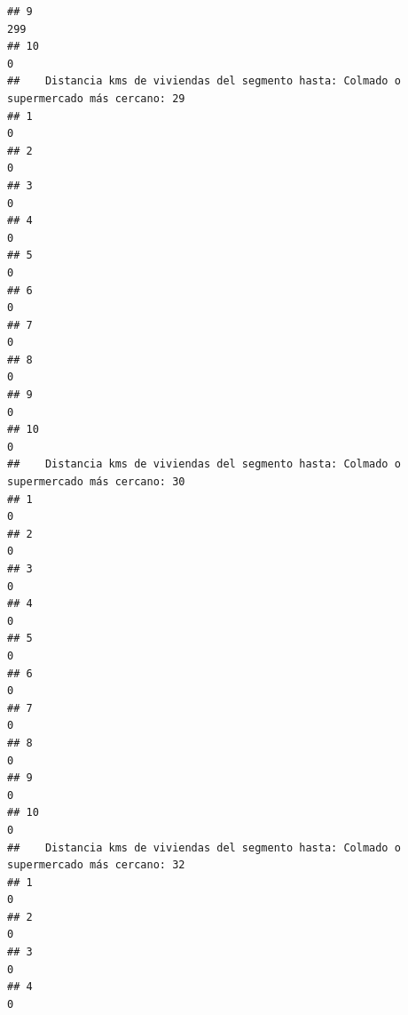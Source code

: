 \documentclass[11pt,]{article}
\begin{document}
\begin{verbatim}
## 9                                                                                    299
## 10                                                                                     0
##    Distancia kms de viviendas del segmento hasta: Colmado o supermercado más cercano: 29
## 1                                                                                      0
## 2                                                                                      0
## 3                                                                                      0
## 4                                                                                      0
## 5                                                                                      0
## 6                                                                                      0
## 7                                                                                      0
## 8                                                                                      0
## 9                                                                                      0
## 10                                                                                     0
##    Distancia kms de viviendas del segmento hasta: Colmado o supermercado más cercano: 30
## 1                                                                                      0
## 2                                                                                      0
## 3                                                                                      0
## 4                                                                                      0
## 5                                                                                      0
## 6                                                                                      0
## 7                                                                                      0
## 8                                                                                      0
## 9                                                                                      0
## 10                                                                                     0
##    Distancia kms de viviendas del segmento hasta: Colmado o supermercado más cercano: 32
## 1                                                                                      0
## 2                                                                                      0
## 3                                                                                      0
## 4                                                                                      0

\end{verbatim}
\end{document}
